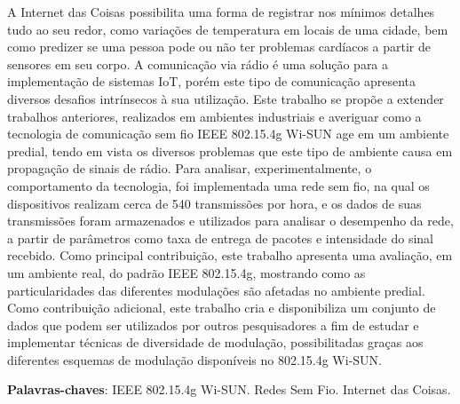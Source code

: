 \setlength{\absparsep}{18pt} %
\begin{resumo}
  A Internet das Coisas possibilita uma forma de registrar nos mínimos detalhes tudo ao seu redor, como variações de temperatura em locais de uma cidade, bem como predizer se uma pessoa pode ou não ter problemas cardíacos a partir de sensores em seu corpo. A comunicação via rádio é uma solução para a implementação de sistemas IoT, porém este tipo de comunicação apresenta diversos desafios intrínsecos à sua utilização. Este trabalho se propõe a extender trabalhos anteriores, realizados em ambientes industriais e averiguar como a tecnologia de comunicação sem fio IEEE 802.15.4g Wi-SUN age em um ambiente predial, tendo em vista os diversos problemas que este tipo de ambiente causa em propagação de sinais de rádio. Para analisar, experimentalmente, o comportamento da tecnologia, foi implementada uma rede sem fio, na qual os dispositivos realizam cerca de 540 transmissões por hora, e os dados de suas transmissões foram armazenados e utilizados para analisar o desempenho da rede, a partir de parâmetros como taxa de entrega de pacotes e intensidade do sinal recebido. Como principal contribuição, este trabalho apresenta uma avaliação, em um ambiente real, do padrão IEEE 802.15.4g, mostrando como as particularidades das diferentes modulações são afetadas no ambiente predial. Como contribuição adicional, este trabalho cria e disponibiliza um conjunto de dados que podem ser utilizados por outros pesquisadores a fim de estudar e implementar técnicas de diversidade de modulação, possibilitadas graças aos diferentes esquemas de modulação disponíveis no 802.15.4g Wi-SUN.


  \textbf{Palavras-chaves}: IEEE 802.15.4g Wi-SUN. Redes Sem Fio. Internet das Coisas.
\end{resumo}

